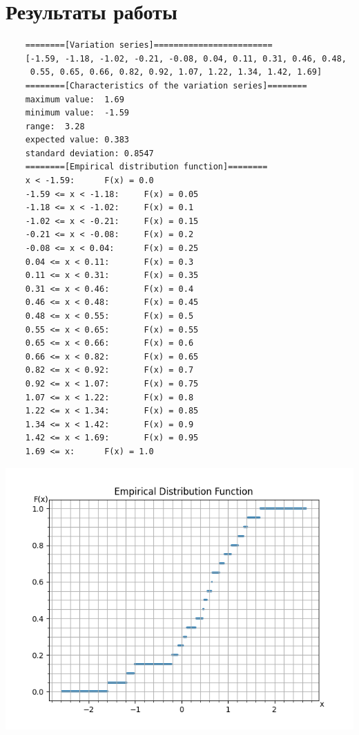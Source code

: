 \documentclass[12pt,one column]{article}
\begin{document}
\section{Результаты работы} 
\begin{verbatim}
    ========[Variation series]========================
    [-1.59, -1.18, -1.02, -0.21, -0.08, 0.04, 0.11, 0.31, 0.46, 0.48,
     0.55, 0.65, 0.66, 0.82, 0.92, 1.07, 1.22, 1.34, 1.42, 1.69]
    ========[Characteristics of the variation series]========
    maximum value:  1.69
    minimum value:  -1.59
    range:  3.28
    expected value: 0.383
    standard deviation: 0.8547
    ========[Empirical distribution function]========
    x < -1.59:      F(x) = 0.0
    -1.59 <= x < -1.18:     F(x) = 0.05
    -1.18 <= x < -1.02:     F(x) = 0.1
    -1.02 <= x < -0.21:     F(x) = 0.15
    -0.21 <= x < -0.08:     F(x) = 0.2
    -0.08 <= x < 0.04:      F(x) = 0.25
    0.04 <= x < 0.11:       F(x) = 0.3
    0.11 <= x < 0.31:       F(x) = 0.35
    0.31 <= x < 0.46:       F(x) = 0.4
    0.46 <= x < 0.48:       F(x) = 0.45
    0.48 <= x < 0.55:       F(x) = 0.5
    0.55 <= x < 0.65:       F(x) = 0.55
    0.65 <= x < 0.66:       F(x) = 0.6
    0.66 <= x < 0.82:       F(x) = 0.65
    0.82 <= x < 0.92:       F(x) = 0.7
    0.92 <= x < 1.07:       F(x) = 0.75
    1.07 <= x < 1.22:       F(x) = 0.8
    1.22 <= x < 1.34:       F(x) = 0.85
    1.34 <= x < 1.42:       F(x) = 0.9
    1.42 <= x < 1.69:       F(x) = 0.95
    1.69 <= x:      F(x) = 1.0
\end{verbatim}
\includegraphics[width=\textwidth]{plot1.png}
\end{document}
